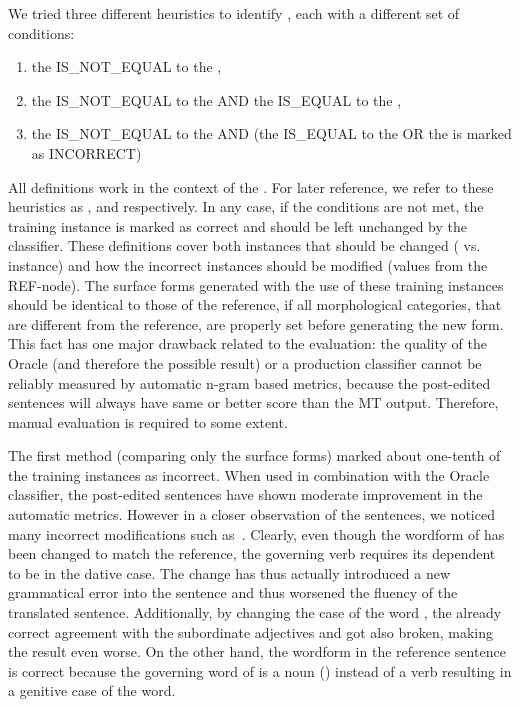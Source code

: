 We tried three different heuristics to identify , each with a different set of conditions:
\begin{enumerate}
    \item the  IS\_NOT\_EQUAL to the ,
    \item the  IS\_NOT\_EQUAL to the  AND the  IS\_EQUAL to the ,
    \item the  IS\_NOT\_EQUAL to the  AND (the  IS\_EQUAL to the 
        OR the  is marked as INCORRECT)
\end{enumerate}
All definitions work in the context of the . For later reference, we refer to
these heuristics as ,  and  respectively.
In any case, if the conditions
are not met, the training instance is marked as correct and should be left unchanged by the classifier.
These definitions cover both instances that should be changed ( vs.  instance)
and how the incorrect instances should be modified (values from the REF-node). The surface forms
generated with the use of these training instances should be identical to those of the reference,
if all morphological categories, that are different from the reference, are properly set before generating the new form.
This fact has one major drawback related to the evaluation:
the quality of the Oracle (and therefore the 
possible result) or a production classifier cannot be reliably measured by automatic n-gram based metrics, because the post-edited
sentences will always have same or better score than the MT output. Therefore, manual evaluation is required
to some extent.

The first method (comparing only the surface forms) marked about one-tenth of the training instances as incorrect. When used in combination
with the Oracle classifier, the post-edited sentences have shown moderate improvement in the automatic metrics.
However in a closer observation of the sentences, we noticed many incorrect modifications such as~.
Clearly, even though the wordform of  has been changed to match the reference,
the governing verb  requires its dependent to be in the dative case. The change
has thus actually introduced a new grammatical error into the sentence and thus worsened
the fluency of the translated sentence. Additionally, by changing 
the case of the word , the already correct agreement with the subordinate adjectives
 and  got also broken, making the result even worse. On the other hand,
the wordform in the reference sentence is correct because the governing word of 
is a noun () instead of a verb resulting in a genitive case of the word.

